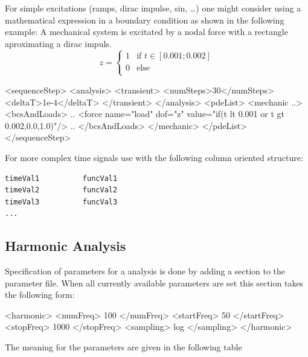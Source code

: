 \bigskip

\noindent
For simple excitations (ramps, dirac impulse, sin, \ldots) one might
consider using a mathematical expression in a boundary condition as
shown in the following example: A mechanical system is excitated by a
nodal force with a
rectangle aproximating a dirac impuls.   
\begin{displaymath}
z = \left\{ \begin{array}{ll}
1 & \textrm{if $t \in [0.001; 0.002]$}\\
0 & \textrm{else}\\
\end{array} \right.
\end{displaymath}
\begin{xmllisting} 
<sequenceStep>
 <analysis>
  <transient>
    <numSteps>30</numSteps>
    <deltaT>1e-4</deltaT>
  </transient>
 </analysis>
 <pdeList>
  <mechanic ..>
   <bcsAndLoads>
     ..
     <force name="load" dof="z" value="if(t lt 0.001 or t gt 0.002,0.0,1.0)"/>
     ..
   </bcsAndLoads>
  </mechanic>
 </pdeList>
</sequenceStep>
\end{xmllisting}

\noindent
For more complex time signals use  with the following
column oriented
structure:
\begin{verbatim}
timeVal1          funcVal1
timeVal2          funcVal2
timeVal3          funcVal3
...
\end{verbatim}

\subsection{Harmonic Analysis}
%
Specification of parameters for a  analysis is done by adding
a  section to the parameter file. When all currently
available
parameters are set this section takes the following form:
%
%
\begin{xmllisting}
  <harmonic>
    <numFreq>    100   </numFreq>
    <startFreq>  50   </startFreq>
    <stopFreq>   1000   </stopFreq>
    <sampling>   log   </sampling>
  </harmonic>
\end{xmllisting}
%
%
The meaning for the parameters are given in the following table
%
%


